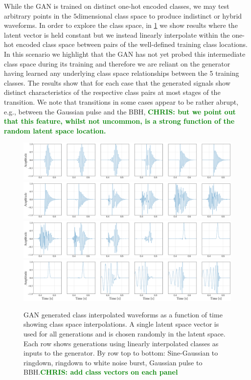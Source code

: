\documentclass[12pt]{iopart}
\newcommand{\chris}[1]{\textbf{\textcolor{green}{CHRIS: #1}}}
\newcommand{\ndimensional}[1]{$#1$\nobreakdash\discretionary{-}{-}{-}dimensional}
\begin{document}
While the \ac{GAN} is trained on distinct one-hot encoded classes, we may test arbitrary points in the \ndimensional{5} class space to produce indistinct or hybrid waveforms. In order to explore the class space, in \cref{fig:c_interp} we show results where the latent vector is held constant but we instead linearly
interpolate within the one-hot encoded class space between pairs of the well-defined training class locations. In this scenario we highlight that the \ac{GAN} has not yet probed this intermediate class space during its training and therefore we are reliant on the generator having learned any underlying class space relationships between the 5 training classes. The results show that for each case that the generated signals show distinct characteristics of the respective class pairs at most stages of the transition. We note that transitions in some cases appear to be rather abrupt, e.g., between the Gaussian pulse and the \ac{BBH}, \chris{but we point out that this feature, whilst not uncommon, is a strong function of the random latent space location.} 
%
\begin{figure}[!h]
    \centering
    \includegraphics[width=\textwidth]{figures/generations/sg-rd.png}
    \includegraphics[width=\textwidth]{figures/generations/rd-wnb.png}
    \includegraphics[width=\textwidth]{figures/generations/wnb-blip.png}
    \includegraphics[width=\textwidth]{figures/generations/blip-bbh.png}
    \caption{\ac{GAN} generated class interpolated waveforms as a function of time showing class space interpolations. A single latent space vector is used for all generations and is chosen randomly in the latent space. Each row shows generations using linearly interpolated classes as inputs to the generator. By row top to bottom: Sine-Gaussian to ringdown, ringdown to white noise burst, Gaussian pulse to BBH.\chris{add class vectors on each panel}}
    \label{fig:c_interp}
\end{figure}
%
\end{document}
